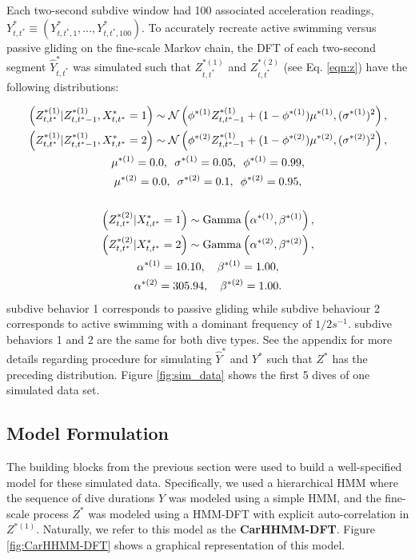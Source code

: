 Each two-second subdive window had 100 associated acceleration readings, $Y^*_{t,t^*} \equiv \left(Y^*_{t,t^*,1}, \ldots, Y^*_{t,t^*,100}\right)$. To accurately recreate active swimming versus passive gliding on the fine-scale Markov chain, the DFT of each two-second segment $\hat Y^*_{t,t^*}$ was simulated such that $Z^{*(1)}_{t,t^*}$ and $Z^{*(2)}_{t,t^*}$ (see Eq. \ref{eqn:z}) have the following distributions: 

\begin{gather*}
    \left(Z^{*(1)}_{t,t^*} | Z^{*(1)}_{t,t^*-1}, X^*_{t,t^*} = 1 \right) \sim \mathcal{N} \left(\phi^{*(1)}Z^{*(1)}_{t,t^*-1} + (1-\phi^{*(1)})\mu^{*(1)}, (\sigma^{*(1)})^2 \right), \\
    \left(Z^{*(1)}_{t,t^*} | Z^{*(1)}_{t,t^*-1}, X^*_{t,t^*} = 2 \right) \sim \mathcal{N} \left(\phi^{*(2)}Z^{*(1)}_{t,t^*-1} + (1-\phi^{*(2)})\mu^{*(2)}, (\sigma^{*(2)})^2 \right), \\
    \mu^{*(1)} = 0.0,\enspace \sigma^{*(1)} = 0.05,\enspace \phi^{*(1)} = 0.99, \\
    \mu^{*(2)} = 0.0,\enspace \sigma^{*(2)} = 0.1,\enspace \phi^{*(2)} = 0.95, \\\\
    \left(Z^{*(2)}_{t,t^*} | X^*_{t,t^*} = 1\right) \sim {\rm{Gamma}}\left(\alpha^{*(1)}, \beta^{*(1)} \right), \\
    \left(Z^{*(2)}_{t,t^*} | X^*_{t,t^*} = 2\right) \sim {\rm{Gamma}}\left(\alpha^{*(2)}, \beta^{*(2)} \right), \\
    \alpha^{*(1)} = 10.10, \enspace \enspace \beta^{*(1)} = 1.00, \\
    \alpha^{*(2)} = 305.94, \enspace \enspace \beta^{*(2)} = 1.00.
\end{gather*}
%
subdive behavior 1 corresponds to passive gliding while subdive behaviour 2 corresponds to active swimming with a dominant frequency of $1/2 s^{-1}$. subdive behaviors 1 and 2 are the same for both dive types. See the appendix for more details regarding procedure for simulating $\hat Y^*$ and $Y^*$ such that $Z^*$ has the preceding distribution. Figure \ref{fig:sim_data} shows the first 5 dives of one simulated data set.

\subsection{Model Formulation}
\label{subsec:model_structure}

The building blocks from the previous section were used to build a well-specified model for these simulated data. Specifically, we used a hierarchical HMM where the sequence of dive durations $Y$ was modeled using a simple HMM, and the fine-scale process $Z^*$ was modeled using a HMM-DFT with explicit auto-correlation in $Z^{*(1)}$. Naturally, we refer to this model as the \textbf{CarHHMM-DFT}. Figure \ref{fig:CarHHMM-DFT} shows a graphical representation of this model. 

